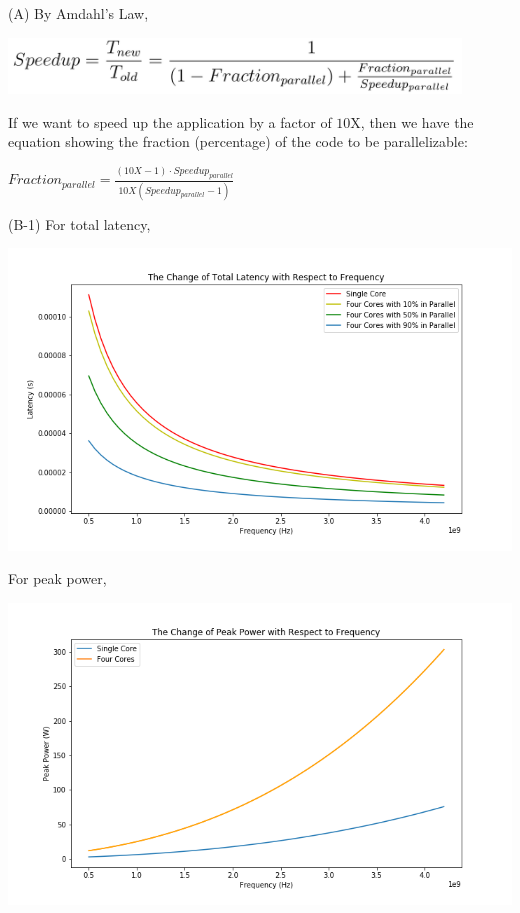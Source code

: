 \documentclass[11pt]{article}
\begin{document}
\begin{solution}
(A) By Amdahl’s Law,
\begin{center}
\includegraphics[width=12cm]{3.png}
\end{center}
If we want to speed up the application by a factor of $10$X, then we have the equation showing the fraction (percentage) of the code to be  parallelizable:
\item $Fraction_{parallel} = \frac{(10X-1) \cdot Speedup_{parallel}}{10X(Speedup_{parallel}-1)}$
\item (B-1) For total latency, 
\begin{center}
\includegraphics[width=15cm]{B1_1.png}
\end{center}
\pagebreak
For peak power,
\begin{center}
\includegraphics[width=15cm]{B1_2.png}
\end{center}

\end{solution}
\end{document}
